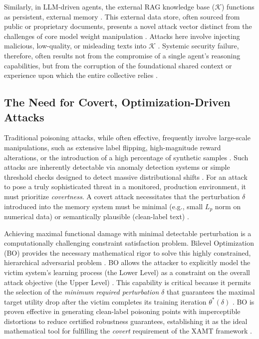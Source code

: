\documentclass[conference]{IEEEtran}
\begin{document}
Similarly, in LLM-driven agents, the external RAG knowledge base ($\mathcal{K}$) functions as persistent, external memory \cite{Ref2}. This external data store, often sourced from public or proprietary documents, presents a novel attack vector distinct from the challenges of core model weight manipulation \cite{Ref14, Ref15}. Attacks here involve injecting malicious, low-quality, or misleading texts into $\mathcal{K}$ \cite{Ref7, Ref16}. Systemic security failure, therefore, often results not from the compromise of a single agent's reasoning capabilities, but from the corruption of the foundational shared context or experience upon which the entire collective relies \cite{Ref1}.

\subsection{The Need for Covert, Optimization-Driven Attacks}
Traditional poisoning attacks, while often effective, frequently involve large-scale manipulations, such as extensive label flipping, high-magnitude reward alterations, or the introduction of a high percentage of synthetic samples \cite{Ref12, Ref17}. Such attacks are inherently detectable via anomaly detection systems or simple threshold checks designed to detect massive distributional shifts \cite{Ref18}. For an attack to pose a truly sophisticated threat in a monitored, production environment, it must prioritize \textit{covertness}. A covert attack necessitates that the perturbation $\delta$ introduced into the memory system must be minimal (e.g., small $L_p$ norm on numerical data) or semantically plausible (clean-label text) \cite{Ref19, Ref20}.

Achieving maximal functional damage with minimal detectable perturbation is a computationally challenging constraint satisfaction problem. Bilevel Optimization (BO) provides the necessary mathematical rigor to solve this highly constrained, hierarchical adversarial problem \cite{Ref21, Ref22}. BO allows the attacker to explicitly model the victim system's learning process (the Lower Level) as a constraint on the overall attack objective (the Upper Level) \cite{Ref23}. This capability is critical because it permits the selection of the \textit{minimum required perturbation} $\delta$ that guarantees the maximal target utility drop after the victim completes its training iteration $\theta^*(\delta)$ \cite{Ref24, Ref25}. BO is proven effective in generating clean-label poisoning points with imperceptible distortions to reduce certified robustness guarantees, establishing it as the ideal mathematical tool for fulfilling the \textit{covert} requirement of the XAMT framework \cite{Ref19, Ref20}.
\end{document}
